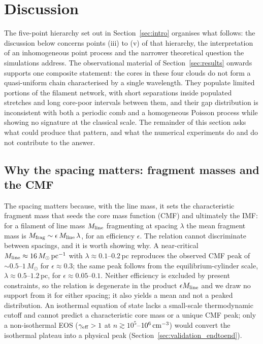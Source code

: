 \documentclass[usenatbib,twoside,twocolumn]{mnras}
\begin{document}
\section{Discussion}

\noindent The five-point hierarchy set out in Section~\ref{sec:intro} organises what follows: the discussion below concerns points (iii) to (v) of that hierarchy, the interpretation of an inhomogeneous point process and the narrower theoretical question the simulations address. The observational material of Section~\ref{sec:results} onwards supports one composite statement: the cores in these four clouds do not form a quasi-uniform chain characterised by a single wavelength. They populate limited portions of the filament network, with short separations inside populated stretches and long core-poor intervals between them, and their gap distribution is inconsistent with both a periodic comb and a homogeneous Poisson process while showing no signature at the classical scale. The remainder of this section asks what could produce that pattern, and what the numerical experiments do and do not contribute to the answer.
\label{sec:discussion}

\subsection{Why the spacing matters: fragment masses and the CMF}
\label{sec:cmf}
The spacing matters because, with the line mass, it sets the characteristic fragment mass that seeds the core mass function (CMF) and ultimately the IMF: for a filament of line mass $M_{\rm line}$ fragmenting at spacing $\lambda$ the mean fragment mass is $M_{\rm frag}\sim\epsilon\,M_{\rm line}\,\lambda$, for an efficiency $\epsilon$. The relation cannot discriminate between spacings, and it is worth showing why. A near-critical $M_{\rm line}\approx16\,M_\odot\,{\rm pc^{-1}}$ with $\lambda\approx0.1$--$0.2$\,pc reproduces the observed CMF peak of $\sim0.5$--$1\,M_\odot$ for $\epsilon\approx0.3$; the same peak follows from the equilibrium-cylinder scale, $\lambda\approx0.5$--$1.2$\,pc, for $\epsilon\approx0.05$--$0.1$. Neither efficiency is excluded by present constraints, so the relation is degenerate in the product $\epsilon M_{\rm line}$ and we draw no support from it for either spacing; it also yields a mean and not a peaked distribution. An isothermal equation of state lacks a small-scale thermodynamic cutoff and cannot predict a characteristic core mass or a unique CMF peak; only a non-isothermal EOS ($\gamma_{\rm eff}>1$ at $n\gtrsim10^{5}$--$10^{6}\,{\rm cm^{-3}}$) would convert the isothermal plateau into a physical peak (Section~\ref{sec:validation_endtoend}).
\end{document}

